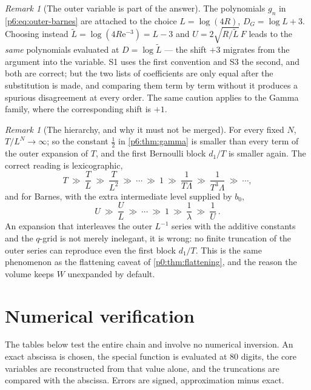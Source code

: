 \documentclass[11pt,a4paper,oneside]{book}
\theoremstyle{plain}
\theoremstyle{definition}
\theoremstyle{remark}
\newtheorem{remark}[theorem]{Remark}
\newcommand{\e}{\mathrm{e}}
\newcommand{\Wlam}{W}
\begin{document}
\begin{remark}[The outer variable is part of the answer]
\label{p6:rem:outer-variable}
The polynomials $g_n$ in \eqref{p6:eq:outer-barnes} are attached to the choice
$L=\log(4R)$, $D_G=\log L+3$.  Choosing instead
$\widetilde L=\log(4R\e^{-3})=L-3$ and $U=2\sqrt{R/\widetilde L}\,F$ leads to
the \emph{same} polynomials evaluated at $D=\log\widetilde L$ --- the shift
$+3$ migrates from the argument into the variable.  S1 uses the first
convention and S3 the second, and both are correct; but the two lists of
coefficients are only equal after the substitution is made, and comparing them
term by term without it produces a spurious disagreement at every order.  The
same caution applies to the Gamma family, where the corresponding shift is
$+1$.
\end{remark}

\begin{remark}[The hierarchy, and why it must not be merged]
\label{p6:rem:hierarchy}
For every fixed $N$, $T/L^{N}\to\infty$; so the constant $\tfrac12$ in
\cref{p6:thm:gamma} is smaller than every term of the outer expansion of $T$,
and the first Bernoulli block $d_1/T$ is smaller again.  The correct reading
is lexicographic,
\begin{equation}\label{p6:eq:gamma-hierarchy}
 T\ \gg\ \frac TL\ \gg\ \frac T{L^{2}}\ \gg\ \cdots\ \gg\ 1
 \ \gg\ \frac1{T\Lambda}\ \gg\ \frac1{T^{3}\Lambda}\ \gg\ \cdots,
\end{equation}
and for Barnes, with the extra intermediate level supplied by $b_0$,
\begin{equation}\label{p6:eq:barnes-hierarchy}
 U\ \gg\ \frac U{L}\ \gg\ \cdots\ \gg\ 1\ \gg\ \frac1\lambda
 \ \gg\ \frac1U\ .
\end{equation}
An expansion that interleaves the outer $L^{-1}$ series with the additive
constants and the $q$-grid is not merely inelegant, it is wrong: no finite
truncation of the outer series can reproduce even the first block $d_1/T$.
This is the same phenomenon as the flattening caveat of
\cref{p0:thm:flattening}, and the reason the volume keeps $\Wlam$ unexpanded
by default.
\end{remark}

\section{Numerical verification}
\label{p6:sec:numerics}

The tables below test the entire chain and involve no numerical inversion.  An
exact abscissa is chosen, the special function is evaluated at $80$ digits,
the core variables are reconstructed from that value alone, and the
truncations are compared with the abscissa.  Errors are signed, approximation
minus exact.
\end{document}
